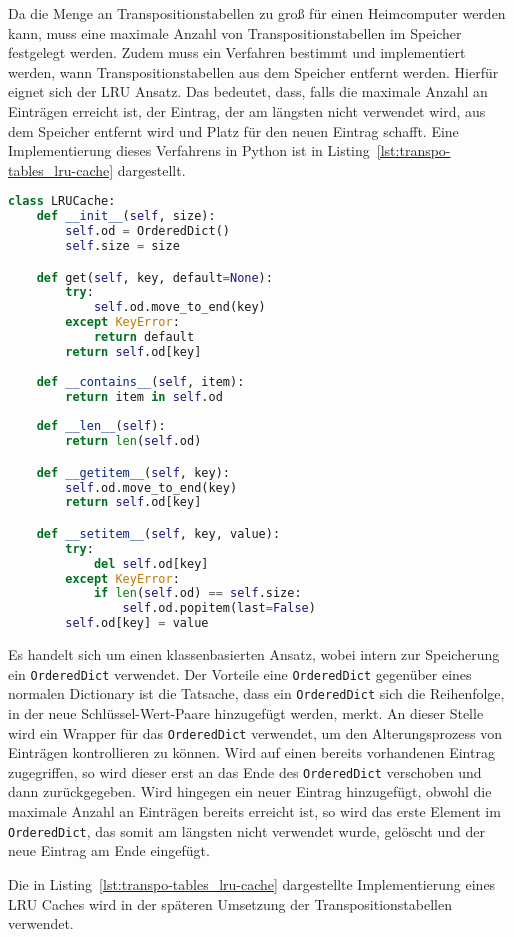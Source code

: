 Da die Menge an Transpositionstabellen zu groß für einen Heimcomputer werden kann, muss eine maximale Anzahl von Transpositionstabellen im Speicher festgelegt werden.
Zudem muss ein Verfahren bestimmt und implementiert werden, wann Transpositionstabellen aus dem Speicher entfernt werden.
Hierfür eignet sich der \ac{LRU} Ansatz.
Das bedeutet, dass, falls die maximale Anzahl an Einträgen erreicht ist, der Eintrag, der am längsten nicht verwendet wird, aus dem Speicher entfernt wird und Platz für den neuen Eintrag schafft.
Eine Implementierung dieses Verfahrens in Python ist in Listing~\ref{lst:transpo-tables_lru-cache} dargestellt.

\bigskip

\begin{lstlisting}[caption={Implementierung eines LRU Caches}, captionpos=b, label={lst:transpo-tables_lru-cache}, language=Python]
class LRUCache:
    def __init__(self, size):
        self.od = OrderedDict()
        self.size = size

    def get(self, key, default=None):
        try:
            self.od.move_to_end(key)
        except KeyError:
            return default
        return self.od[key]
    
    def __contains__(self, item):
        return item in self.od
    
    def __len__(self):
        return len(self.od)

    def __getitem__(self, key):
        self.od.move_to_end(key)
        return self.od[key]

    def __setitem__(self, key, value):
        try:
            del self.od[key]
        except KeyError:
            if len(self.od) == self.size:
                self.od.popitem(last=False)
        self.od[key] = value
\end{lstlisting}

\noindent Es handelt sich um einen klassenbasierten Ansatz, wobei intern zur Speicherung ein \lstinline[language=Python]{OrderedDict} verwendet.
Der Vorteile eine \lstinline[language=Python]{OrderedDict} gegenüber eines normalen Dictionary ist die Tatsache, dass ein \lstinline[language=Python]{OrderedDict} sich die Reihenfolge, in der neue Schlüssel-Wert-Paare hinzugefügt werden, merkt.
An dieser Stelle wird ein Wrapper für das \lstinline[language=Python]{OrderedDict} verwendet, um den Alterungsprozess von Einträgen kontrollieren zu können.
Wird auf einen bereits vorhandenen Eintrag zugegriffen, so wird dieser erst an das Ende des \lstinline[language=Python]{OrderedDict} verschoben und dann zurückgegeben.
Wird hingegen ein neuer Eintrag hinzugefügt, obwohl die maximale Anzahl an Einträgen bereits erreicht ist, so wird das erste Element im \lstinline[language=Python]{OrderedDict}, das somit am längsten nicht verwendet wurde, gelöscht und der neue Eintrag am Ende eingefügt.

Die in Listing~\ref{lst:transpo-tables_lru-cache} dargestellte Implementierung eines \ac{LRU} Caches wird in der späteren Umsetzung der Transpositionstabellen verwendet.
